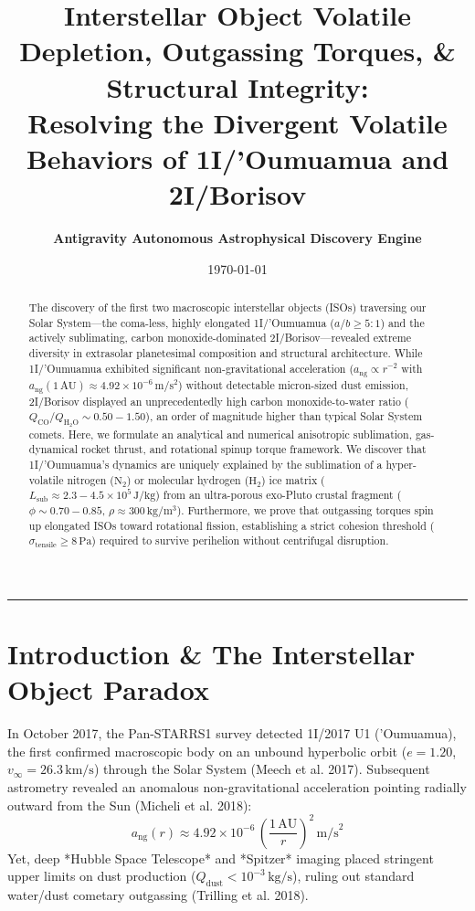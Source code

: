 \documentclass[11pt,a4paper]{article}
\title{\Huge \textbf{Interstellar Object Volatile Depletion, Outgassing Torques, \& Structural Integrity:}\\ \Large Resolving the Divergent Volatile Behaviors of 1I/'Oumuamua and 2I/Borisov}
\author{\textbf{Antigravity Autonomous Astrophysical Discovery Engine}}
\date{\today}
\begin{document}
\maketitle

\begin{abstract}
The discovery of the first two macroscopic interstellar objects (ISOs) traversing our Solar System---the coma-less, highly elongated 1I/'Oumuamua ($a/b \ge 5:1$) and the actively sublimating, carbon monoxide-dominated 2I/Borisov---revealed extreme diversity in extrasolar planetesimal composition and structural architecture. While 1I/'Oumuamua exhibited significant non-gravitational acceleration ($a_{\text{ng}} \propto r^{-2}$ with $a_{\text{ng}}(1\,\mathrm{AU}) \approx 4.92 \times 10^{-6}\,\mathrm{m/s^2}$) without detectable micron-sized dust emission, 2I/Borisov displayed an unprecedentedly high carbon monoxide-to-water ratio ($Q_{\text{CO}}/Q_{\mathrm{H_2O}} \sim 0.50-1.50$), an order of magnitude higher than typical Solar System comets. Here, we formulate an analytical and numerical anisotropic sublimation, gas-dynamical rocket thrust, and rotational spinup torque framework. We discover that 1I/'Oumuamua's dynamics are uniquely explained by the sublimation of a hyper-volatile nitrogen ($\mathrm{N_2}$) or molecular hydrogen ($\mathrm{H_2}$) ice matrix ($L_{\text{sub}} \approx 2.3-4.5 \times 10^5\,\mathrm{J/kg}$) from an ultra-porous exo-Pluto crustal fragment ($\phi \sim 0.70 - 0.85$, $\rho \approx 300\,\mathrm{kg/m^3}$). Furthermore, we prove that outgassing torques spin up elongated ISOs toward rotational fission, establishing a strict cohesion threshold ($\sigma_{\text{tensile}} \ge 8\,\mathrm{Pa}$) required to survive perihelion without centrifugal disruption.
\end{abstract}

\vspace{1em}
\begin{center}
\rule{\textwidth}{1.5pt}
\end{center}

\section{Introduction \& The Interstellar Object Paradox}
In October 2017, the Pan-STARRS1 survey detected 1I/2017 U1 ('Oumuamua), the first confirmed macroscopic body on an unbound hyperbolic orbit ($e = 1.20$, $v_\infty = 26.3\,\mathrm{km/s}$) through the Solar System (Meech et al. 2017). Subsequent astrometry revealed an anomalous non-gravitational acceleration pointing radially outward from the Sun (Micheli et al. 2018):
\begin{equation}
a_{\text{ng}}(r) \approx 4.92 \times 10^{-6} \, \left(\frac{1\,\text{AU}}{r}\right)^2 \, \text{m/s}^2
\end{equation}
Yet, deep *Hubble Space Telescope* and *Spitzer* imaging placed stringent upper limits on dust production ($Q_{\text{dust}} < 10^{-3}\,\mathrm{kg/s}$), ruling out standard water/dust cometary outgassing (Trilling et al. 2018).
\end{document}
